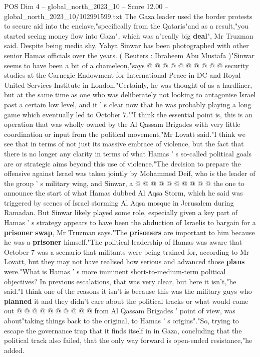 \begin{textsample}{POS Dim 4 – global\_north\_2023\_10 – Score 12.00 – global\_north\_2023\_10/102991599.txt}
The Gaza leader used the border protests to secure aid into the enclave,"specifically from the Qataris"and as a result,"you started seeing money flow into Gaza", which was a"really big \textbf{deal}", Mr Truzman said.
Despite being media shy, Yahya Sinwar has been photographed with other senior Hamas officials over the years. ( Reuters : Ibraheem Abu Mustafa )"Sinwar seems to have been a bit of a chameleon,"says @ @ @ @ @ @ @ @ @ @ security studies at the Carnegie Endowment for International Peace in DC and Royal United Services Institute in London."Certainly, he was thought of as a hardliner, but at the same time as one who was deliberately not looking to antagonise Israel past a certain low level, and it ' s clear now that he was probably playing a long game which eventually led to October 7.""I think the essential point is, this is an operation that was wholly owned by the Al Qassam Brigades with very little coordination or input from the political movement,"Mr Lovatt said."I think we see that in terms of not just its massive embrace of violence, but the fact that there is no longer any clarity in terms of what Hamas ' s so-called political goals are or strategic aims beyond this use of violence."The decision to prepare the offensive against Israel was taken jointly by Mohammed Deif, who is the leader of the group ' s military wing, and Sinwar, a @ @ @ @ @ @ @ @ @ @ the one to announce the start of what Hamas dubbed Al Aqsa Storm, which he said was triggered by scenes of Israel storming Al Aqsa mosque in Jerusalem during Ramadan.
But Sinwar likely played some role, especially given a key part of Hamas ' s strategy appears to have been the abduction of Israelis to bargain for a \textbf{prisoner} \textbf{swap}, Mr Truzman says."The \textbf{prisoners} are important to him because he was a \textbf{prisoner} himself."The political leadership of Hamas was aware that October 7 was a scenario that militants were being trained for, according to Mr Lovatt, but they may not have realised how serious and advanced those \textbf{plans} were."What is Hamas ' s more imminent short-to-medium-term political objectives?
In previous escalations, that was very clear, but here it isn't,"he said."I think one of the reasons it isn't is because this was the military guys who \textbf{planned} it and they didn't care about the political tracks or what would come out @ @ @ @ @ @ @ @ @ @ from Al Qassam Brigades ' point of view, was about"taking things back to the original, to Hamas ' s origins"."So, trying to escape the governance trap that it finds itself in in Gaza, concluding that the political track also failed, that the only way forward is open-ended resistance,"he added.

\end{textsample}
